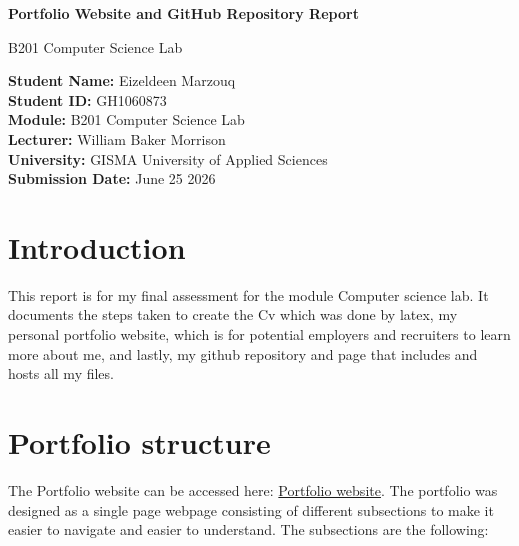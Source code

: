 \documentclass{article}
\begin{document}
\begin{titlepage}
    \centering

    \vspace*{2cm}

    {\Huge\bfseries Portfolio Website and GitHub Repository Report\par}

    \vspace{2cm}

    {\Large B201 Computer Science Lab\par}

    \vspace{1cm}

    

    \begin{flushleft}
        \textbf{Student Name:} Eizeldeen Marzouq\\[0.5cm]
        \textbf{Student ID:} GH1060873\\[0.5cm]
        \textbf{Module:} B201 Computer Science Lab\\[0.5cm]
        \textbf{Lecturer:} William Baker Morrison\\[0.5cm]
        \textbf{University:} GISMA University of Applied Sciences\\[0.5cm]
        \textbf{Submission Date:} June 25 2026
    \end{flushleft}

    \vfill

\end{titlepage}



\tableofcontents
\newpage
\section{Introduction}
This report is for my final assessment for the module Computer science lab. It documents the steps taken to create the Cv which was done by latex, my personal portfolio website, which is for potential employers and recruiters to learn more about me, and lastly, my github repository and page that includes and hosts all my files.
\section{Portfolio structure}
The Portfolio website can be accessed here:
\href{https://eizeldeen-marzouq.github.io/EizeldeenMarzouq-Portfolio/#about}{Portfolio website}. The portfolio was designed as a single page webpage consisting of different subsections to make it easier to navigate and easier to understand. The subsections are the following:
\end{document}
